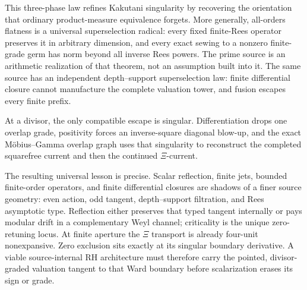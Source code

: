 \documentclass[11pt]{article}
\theoremstyle{definition}
\theoremstyle{remark}
\begin{document}
This three-phase law refines Kakutani singularity by recovering the orientation that ordinary
product-measure equivalence forgets.  More generally, all-orders flatness is a universal
superselection radical: every fixed finite-Rees operator preserves it in arbitrary dimension,
and every exact sewing to a nonzero finite-grade germ has norm beyond all inverse Rees powers.
The prime source is an arithmetic realization of that theorem, not an assumption built into it.
The same source has an independent depth--support superselection law: finite differential closure
cannot manufacture the complete valuation tower, and fusion escapes every finite prefix.

At a divisor, the only compatible escape is singular.  Differentiation drops one overlap grade,
positivity forces an inverse-square diagonal blow-up, and the exact M\"obius--Gamma overlap graph
uses that singularity to reconstruct the completed squarefree current and then the continued
\(\Xi\)-current.

The resulting universal lesson is precise.  Scalar reflection, finite jets, bounded
finite-order operators, and finite differential closures are shadows of a finer source geometry:
even action, odd tangent, depth--support filtration, and Rees asymptotic type.  Reflection either
preserves that typed tangent internally or pays modular drift in a complementary Weyl channel;
criticality is the unique zero-retuning locus.  At finite aperture the \(\Xi\) transport is
already four-unit nonexpansive.  Zero exclusion sits exactly at its singular boundary derivative.  A viable
source-internal RH architecture must therefore carry the pointed, divisor-graded valuation
tangent to that Ward boundary before scalarization erases its sign or grade.
\end{document}
